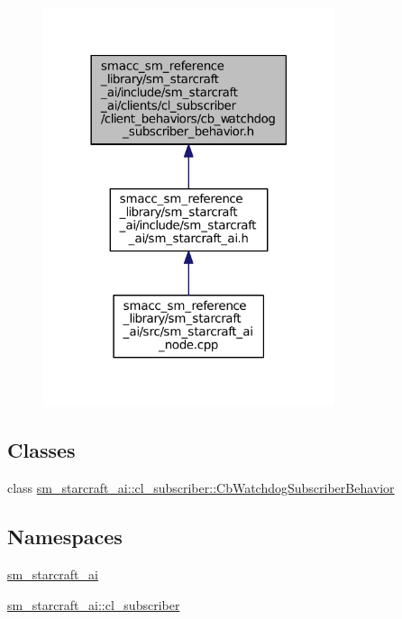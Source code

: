 \begin{figure}[H]
\begin{center}
\leavevmode
\includegraphics[width=242pt]{sm__starcraft__ai_2include_2sm__starcraft__ai_2clients_2cl__subscriber_2client__behaviors_2cb__w1c006e7bf74b225dd0708db7426266b4}
\end{center}
\end{figure}
\subsection*{Classes}
\begin{DoxyCompactItemize}
\item 
class \hyperlink{classsm__starcraft__ai_1_1cl__subscriber_1_1CbWatchdogSubscriberBehavior}{sm\+\_\+starcraft\+\_\+ai\+::cl\+\_\+subscriber\+::\+Cb\+Watchdog\+Subscriber\+Behavior}
\end{DoxyCompactItemize}
\subsection*{Namespaces}
\begin{DoxyCompactItemize}
\item 
 \hyperlink{namespacesm__starcraft__ai}{sm\+\_\+starcraft\+\_\+ai}
\item 
 \hyperlink{namespacesm__starcraft__ai_1_1cl__subscriber}{sm\+\_\+starcraft\+\_\+ai\+::cl\+\_\+subscriber}
\end{DoxyCompactItemize}
